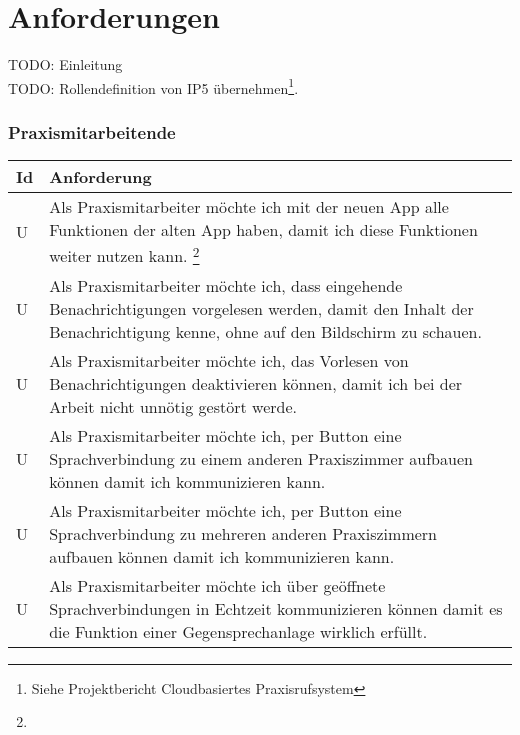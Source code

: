 \section{Anforderungen}

TODO: Einleitung\\
TODO: Rollendefinition von IP5 übernehmen\footnote{Siehe Projektbericht Cloudbasiertes Praxisrufsystem\cite{ip5}}.

\subsubsection*{Praxismitarbeitende}

\begin{table}[h]
    \centering
    \begin{tabular}{|l|p{15cm}|}
        \hline
        \textbf{Id} & \textbf{Anforderung}                                                                                                                                                                       \\
        \hline
        U           & Als Praxismitarbeiter möchte ich mit der neuen App alle Funktionen der alten App haben, damit ich diese Funktionen weiter nutzen kann. \footnote[2]{} \\
        \hline
        U           & Als Praxismitarbeiter möchte ich, dass eingehende Benachrichtigungen vorgelesen werden, damit den Inhalt der Benachrichtigung kenne, ohne auf den Bildschirm zu schauen.                   \\
        \hline
        U           & Als Praxismitarbeiter möchte ich, das Vorlesen von Benachrichtigungen deaktivieren können, damit ich bei der Arbeit nicht unnötig gestört werde.                                           \\
        \hline
        U           & Als Praxismitarbeiter möchte ich, per Button eine Sprachverbindung zu einem anderen Praxiszimmer aufbauen können damit ich kommunizieren kann.                                             \\
        \hline
        U           & Als Praxismitarbeiter möchte ich, per Button eine Sprachverbindung zu mehreren anderen Praxiszimmern aufbauen können damit ich kommunizieren kann.                                         \\
        \hline
        U           & Als Praxismitarbeiter möchte ich über geöffnete Sprachverbindungen in Echtzeit kommunizieren können damit es die Funktion einer Gegensprechanlage wirklich erfüllt.                        \\

\end{tabular}
\end{table}
